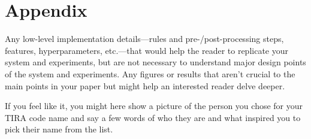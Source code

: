 \documentclass[11pt]{article}
\begin{document}
\appendix
\section{Appendix}
Any low-level implementation details—rules and pre-/post-processing steps, features, hyperparameters, etc.—that would help the reader to replicate your system and experiments, but are not necessary to understand major design points of the system and experiments. Any figures or results that aren’t crucial to the main points in your paper but might help an interested reader delve deeper.

If you feel like it, you might here show a picture of the person you chose for your TIRA code name and say a few words of who they are and what inspired you to pick their name from the list.
\end{document}
